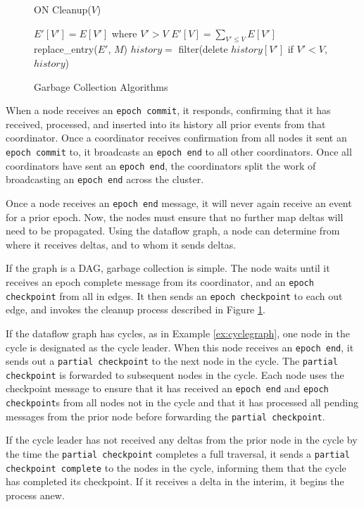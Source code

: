 \documentclass{vldb}
\begin{document}
\begin{figure}
ON Cleanup($V$)
\begin{algorithmic}[1]
    \STATE $E'[V'] = E[V']$ where $V' > V$
    \STATE $E'[V] = \sum_{V' \leq V} E[V']$
    \STATE replace\_entry($E'$, $M$)
  \ENDFOR
\ENDFOR
\STATE $history =$ filter(delete $history[V']$ if $V' < V$, $history$)
\end{algorithmic}
\caption{Garbage Collection Algorithms}
\label{fig:gcalgorithms}
\end{figure}

When a node receives an \texttt{epoch commit}, it responds, confirming that it has received, processed, and inserted into its history all prior events from that coordinator.  Once a coordinator receives confirmation from all nodes it sent an \texttt{epoch commit} to, it broadcasts an \texttt{epoch end} to all other coordinators.  Once all coordinators have sent an \texttt{epoch end}, the coordinators split the work of broadcasting an \texttt{epoch end} across the cluster.

Once a node receives an \texttt{epoch end} message, it will never again receive an event for a prior epoch.  Now, the nodes must ensure that no further map deltas will need to be propagated.  Using the dataflow graph, a node can determine from where it receives deltas, and to whom it sends deltas.  

If the graph is a DAG, garbage collection is simple.  The node waits until it receives an epoch complete message from its coordinator, and an \texttt{epoch checkpoint} from all in edges.  It then sends an \texttt{epoch checkpoint} to each out edge, and invokes the cleanup process described in Figure \ref{fig:gcalgorithms}.

If the dataflow graph has cycles, as in Example \ref{ex:cyclegraph}, one node in the cycle is designated as the cycle leader.  When this node receives an \texttt{epoch end}, it sends out a \texttt{partial checkpoint} to the next node in the cycle.  The \texttt{partial checkpoint} is forwarded to subsequent nodes in the cycle.  Each node uses the checkpoint message to ensure that it has received an \texttt{epoch end} and \texttt{epoch checkpoint}s from all nodes not in the cycle and that it has processed all pending messages from the prior node before forwarding the \texttt{partial checkpoint}.  

If the cycle leader has not received any deltas from the prior node in the cycle by the time the \texttt{partial checkpoint} completes a full traversal, it sends a \texttt{partial checkpoint complete} to the nodes in the cycle, informing them that the cycle has completed its checkpoint. If it receives a delta in the interim, it begins the process anew.
\end{document}
